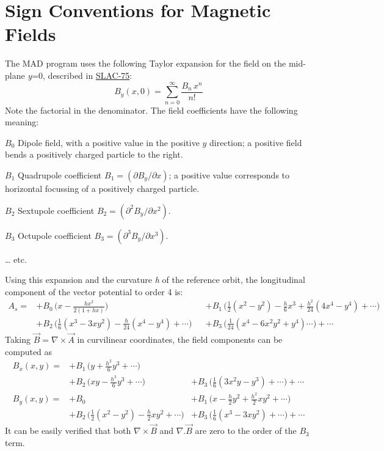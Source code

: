 \section{Sign Conventions for Magnetic Fields}
\label{sec:sign_convention}
The MAD program uses the following Taylor expansion for the field on the
mid-plane \textit{y}=0, described in
\href{bibliography.html#slac75}{SLAC-75}:  
\[
B_{y}(x,0)=\sum_{n=0}^{\infty} \frac{B_n\,x^n}{n!}
\]
Note the factorial in the denominator. 
The field coefficients have the following meaning: 
\begin{madlist}
   \item[$B_0$] 
     Dipole field, with a positive value in the
     positive $y$ direction; a positive field bends a positively
     charged particle to the right.  
   \item[$B_1$] 
     Quadrupole coefficient
     \( B_1 = ( \partial B_y / \partial x ) \);
     a positive value corresponds to horizontal focussing of a
     positively charged particle. 
   \item[$B_2$] 
     Sextupole coefficient
     \( B_2 =  ( \partial^2 B_y / \partial x^2 ) \). 
   \item[$B_3$] 
     Octupole coefficient
     \( B_3 =  ( \partial^3 B_y / \partial x^3 ) \). 
   \item[\ldots] etc.
\end{madlist} 

Using this expansion and the curvature \textit{h} of the reference
orbit, the longitudinal component of the vector potential to order 4 is:  
\[
\begin{aligned}
A_s =  
&+ B_0\,\Big(x-\frac{hx^2}{2(1+hx)}\Big)&
&+ B_1\,\Big(\frac{1}{2}(x^2-y^2) - \frac{h}{6}x^3 + \frac{h^2}{24}(4x^4-y^4)+\cdots\Big) \\
&+ B_2\,\Big(\frac{1}{6}(x^3-3xy^2) - \frac{h}{24}(x^4-y^4)+\cdots \Big)&
&+ B_3\,\Big(\frac{1}{24}(x^4-6x^2y^2+y^4) \cdots \Big)+\cdots
\end{aligned}
\]
Taking \(\vec{B} = \nabla \times \vec{A}\) in curvilinear coordinates,
the field components can be computed as  
\[
\begin{aligned}
B_x(x,y) = &+ B_1\,\Big(y+\frac{h^2}{6}y^3+\cdots\Big)  &  \\
           &+ B_2\,\Big(xy - \frac{h^3}{6}y^3+\cdots \Big) &+ B_3\,\Big(\frac{1}{6}(3x^2y-y^3)+ \cdots \Big)+\cdots\\
B_y(x,y)=  &+ B_0   &+ B_1\,\Big(x-\frac{h}{2}y^2+\frac{h^2}{2}xy^2+\cdots \Big)\\
           &+ B_2\,\Big(\frac{1}{2}(x^2-y^2)-\frac{h}{2}xy^2+\cdots \Big) &+ B_3\,\Big(\frac{1}{6}(x^3-3xy^2)+ \cdots \Big)+\cdots
\end{aligned}
\]
It can be easily verified that both \(\nabla \times \vec{B}\)
and \(\nabla . \vec{B}\) are zero to the order of the
\(B_3\) term.  

